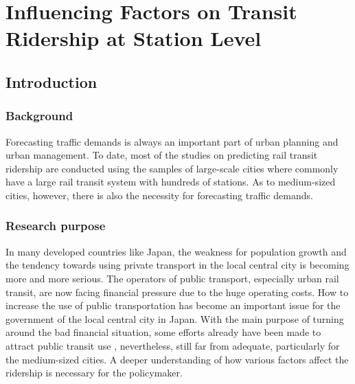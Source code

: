\chapter{Influencing Factors on Transit Ridership at Station Level}
%
\section{Introduction}

\subsection{Background}
%
Forecasting traffic demands is always an important part of urban planning and urban management. To date, most of the studies on predicting rail transit ridership are conducted using the samples of large-scale cities where commonly have a large rail transit system with hundreds of stations. As to medium-sized cities, however, there is also the necessity for forecasting traffic demands. 

\subsection{Research purpose}
%
In many developed countries like Japan, the weakness for population growth and the tendency towards using private transport in the local central city is becoming more and more serious. The operators of public transport, especially urban rail transit, are now facing financial pressure due to the huge operating costs. How to increase the use of public transportation has become an important issue for the government of the local central city in Japan. With the main purpose of turning around the bad financial situation, some efforts already have been made to attract public transit use \cite{nakamura2015study}, nevertheless, still far from adequate, particularly for the medium-sized cities. A deeper understanding of how various factors affect the ridership is necessary for the policymaker.


